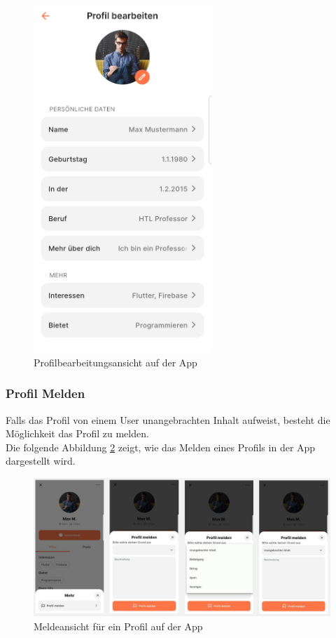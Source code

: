 \begin{figure}[H]
  \centering
  \includegraphics[width=0.6\textwidth]{pics/edit-profile.jpg}
  \caption{Profilbearbeitungsansicht auf der App}
  \label{fig:edit-profile}
\end{figure}


\subsubsection{Profil Melden}
Falls das Profil von einem User unangebrachten Inhalt aufweist, besteht die Möglichkeit das Profil zu melden.
\\
Die folgende Abbildung \ref{fig:report-profile} zeigt, wie das Melden eines Profils in der App dargestellt wird.

\begin{figure}[H]
  \centering
  \includegraphics[width=1\textwidth]{pics/report-profile.JPG}
  \caption{Meldeansicht für ein Profil auf der App}
  \label{fig:report-profile}
\end{figure}



